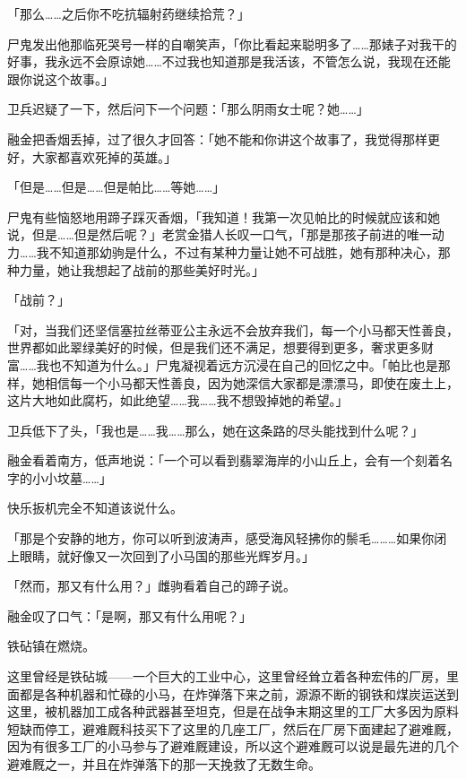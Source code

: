 「那么……之后你不吃抗辐射药继续拾荒？」

尸鬼发出他那临死哭号一样的自嘲笑声，「你比看起来聪明多了……那婊子对我干的好事，我永远不会原谅她……不过我也知道那是我活该，不管怎么说，我现在还能跟你说这个故事。」

卫兵迟疑了一下，然后问下一个问题：「那么阴雨女士呢？她……」

融金把香烟丢掉，过了很久才回答：「她不能和你讲这个故事了，我觉得那样更好，大家都喜欢死掉的英雄。」

「但是……但是……但是帕比……等她……」

尸鬼有些恼怒地用蹄子踩灭香烟，「我知道！我第一次见帕比的时候就应该和她说，但是……但是然后呢？」老赏金猎人长叹一口气，「那是那孩子前进的唯一动力……我不知道那幼驹是什么，不过有某种力量让她不可战胜，她有那种决心，那种力量，她让我想起了战前的那些美好时光。」

「战前？」

「对，当我们还坚信塞拉丝蒂亚公主永远不会放弃我们，每一个小马都天性善良，世界都如此翠绿美好的时候，但是我们还不满足，想要得到更多，奢求更多财富……我也不知道为什么。」尸鬼凝视着远方沉浸在自己的回忆之中。「帕比也是那样，她相信每一个小马都天性善良，因为她深信大家都是漂漂马，即使在废土上，这片大地如此腐朽，如此绝望……我……我不想毁掉她的希望。」

卫兵低下了头，「我也是……我……那么，她在这条路的尽头能找到什么呢？」

融金看着南方，低声地说：「一个可以看到翡翠海岸的小山丘上，会有一个刻着名字的小小坟墓……」

快乐扳机完全不知道该说什么。

「那是个安静的地方，你可以听到波涛声，感受海风轻拂你的鬃毛……\ldots 如果你闭上眼睛，就好像又一次回到了小马国的那些光辉岁月。」

「然而，那又有什么用？」雌驹看着自己的蹄子说。

融金叹了口气：「是啊，那又有什么用呢？」

\horizonline


铁砧镇在燃烧。

这里曾经是铁砧城——一个巨大的工业中心，这里曾经耸立着各种宏伟的厂房，里面都是各种机器和忙碌的小马，在炸弹落下来之前，源源不断的钢铁和煤炭运送到这里，被机器加工成各种武器甚至坦克，但是在战争末期这里的工厂大多因为原料短缺而停工，避难厩科技买下了这里的几座工厂，然后在厂房下面建起了避难厩，因为有很多工厂的小马参与了避难厩建设，所以这个避难厩可以说是最先进的几个避难厩之一，并且在炸弹落下的那一天挽救了无数生命。

